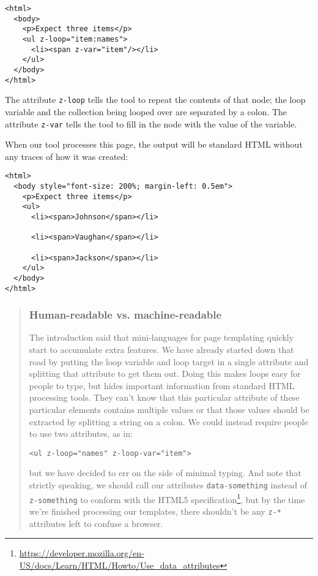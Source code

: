 \documentclass[krantzl]{krantz}
\newenvironment{callout}{\savenotes\begin{tBox}\begin{quotation}\toggletrue{inbox}\renewcommand{\thempfootnote}{\arabic{footnote}}}{\end{quotation}\vspace{\baselineskip}\end{tBox}\togglefalse{inbox}\spewnotes}
\newcommand{\hreffoot}[2]{{#1}\footnote{\href{#2}{#2}}}
\begin{document}
\begin{lstlisting}[frame=single,frameround=tttt]
<html>
  <body>
    <p>Expect three items</p>
    <ul z-loop="item:names">
      <li><span z-var="item"/></li>
    </ul>
  </body>
</html>
\end{lstlisting}



\noindent The attribute \texttt{z-loop} tells the tool to repeat the contents of that node;
the loop variable and the collection being looped over are separated by a colon.
The attribute \texttt{z-var} tells the tool to fill in the node with the value of the variable.


When our tool processes this page,
the output will be standard HTML without any traces of how it was created:


\begin{lstlisting}[frame=single,frameround=tttt]
<html>
  <body style="font-size: 200%; margin-left: 0.5em">
    <p>Expect three items</p>
    <ul>
      <li><span>Johnson</span></li>

      <li><span>Vaughan</span></li>

      <li><span>Jackson</span></li>
    </ul>
  </body>
</html>
\end{lstlisting}


\begin{callout}


\subsubsection*{Human-readable vs. machine-readable}


The introduction said that mini-languages for page templating
quickly start to accumulate extra features.
We have already started down that road
by putting the loop variable and loop target in a single attribute
and splitting that attribute to get them out.
Doing this makes loops easy for people to type,
but hides important information from standard HTML processing tools.
They can't know that this particular attribute of these particular elements
contains multiple values
or that those values should be extracted by splitting a string on a colon.
We could instead require people to use two attributes, as in:

\begin{lstlisting}[frame=single,frameround=tttt]
<ul z-loop="names" z-loop-var="item">
\end{lstlisting}


\noindent but we have decided to err on the side of minimal typing.
And note that strictly speaking,
we should call our attributes \texttt{data-something} instead of \texttt{z-something}
to conform with \hreffoot{the HTML5 specification}{https://developer.mozilla.org/en-US/docs/Learn/HTML/Howto/Use\_data\_attributes},
but by the time we're finished processing our templates,
there shouldn't be any \texttt{z-*} attributes left to confuse a browser.

\end{callout}
\end{document}
